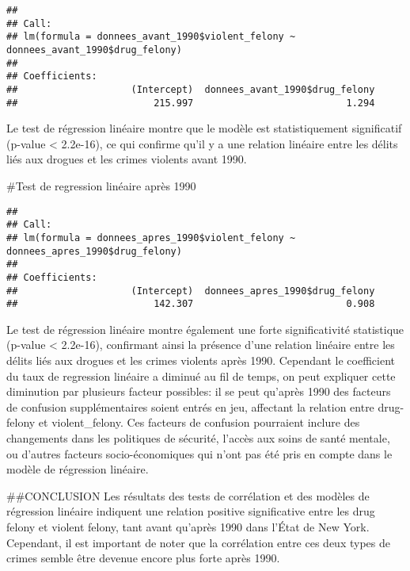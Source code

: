 \documentclass[
]{article}
\newenvironment{Shaded}{\begin{snugshade}}{\end{snugshade}}
\newcommand{\FunctionTok}[1]{\textcolor[rgb]{0.13,0.29,0.53}{\textbf{#1}}}
\newcommand{\NormalTok}[1]{#1}
\newcommand{\SpecialCharTok}[1]{\textcolor[rgb]{0.81,0.36,0.00}{\textbf{#1}}}
\begin{document}
\begin{verbatim}
## 
## Call:
## lm(formula = donnees_avant_1990$violent_felony ~ donnees_avant_1990$drug_felony)
## 
## Coefficients:
##                    (Intercept)  donnees_avant_1990$drug_felony  
##                        215.997                           1.294
\end{verbatim}

Le test de régression linéaire montre que le modèle est statistiquement
significatif (p-value \textless{} 2.2e-16), ce qui confirme qu'il y a
une relation linéaire entre les délits liés aux drogues et les crimes
violents avant 1990.

\#Test de regression linéaire après 1990

\begin{Shaded}
\end{Shaded}

\begin{verbatim}
## 
## Call:
## lm(formula = donnees_apres_1990$violent_felony ~ donnees_apres_1990$drug_felony)
## 
## Coefficients:
##                    (Intercept)  donnees_apres_1990$drug_felony  
##                        142.307                           0.908
\end{verbatim}

Le test de régression linéaire montre également une forte
significativité statistique (p-value \textless{} 2.2e-16), confirmant
ainsi la présence d'une relation linéaire entre les délits liés aux
drogues et les crimes violents après 1990. Cependant le coefficient du
taux de regression linéaire a diminué au fil de temps, on peut expliquer
cette diminution par plusieurs facteur possibles: il se peut qu'après
1990 des facteurs de confusion supplémentaires soient entrés en jeu,
affectant la relation entre drug-felony et violent\_felony. Ces facteurs
de confusion pourraient inclure des changements dans les politiques de
sécurité, l'accès aux soins de santé mentale, ou d'autres facteurs
socio-économiques qui n'ont pas été pris en compte dans le modèle de
régression linéaire.

\#\#CONCLUSION Les résultats des tests de corrélation et des modèles de
régression linéaire indiquent une relation positive significative entre
les drug felony et violent felony, tant avant qu'après 1990 dans l'État
de New York. Cependant, il est important de noter que la corrélation
entre ces deux types de crimes semble être devenue encore plus forte
après 1990.
\end{document}
